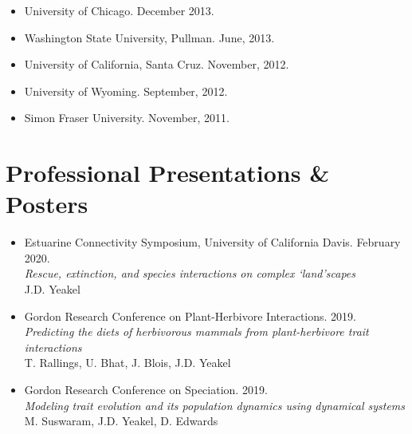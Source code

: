 \documentclass[margin,line,12pt]{res}
\begin{document}
\begin{resume}
\begin{itemize}
\item University of Chicago. December 2013.

\item Washington State University, Pullman. June, 2013.

\item University of California, Santa Cruz. November, 2012.

\item University of Wyoming. September, 2012.

\item Simon Fraser University. November, 2011.
\end{itemize}

\section{\sc Professional Presentations \& Posters}
\begin{itemize}

\item Estuarine Connectivity Symposium, University of California Davis. February 2020.\\
\emph{Rescue, extinction, and species interactions on complex `land'scapes}\\
J.D. Yeakel

\item Gordon Research Conference on Plant-Herbivore Interactions. 2019.\\
\emph{Predicting the diets of herbivorous mammals from plant-herbivore trait interactions}\\
T. Rallings, U. Bhat, J. Blois, J.D. Yeakel

\item Gordon Research Conference on Speciation. 2019.\\
\emph{Modeling trait evolution and its population dynamics using dynamical systems}\\
M. Suswaram, J.D. Yeakel, D. Edwards


\end{itemize}
\end{resume}
\end{document}
